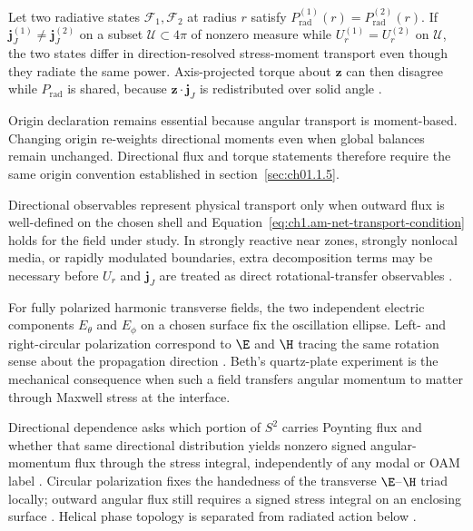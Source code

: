 \label{prop:ch1.directional-nonequivalence}
Let two radiative states \(\mathcal{F}_1,\mathcal{F}_2\) at radius \(r\) satisfy
\(P_{\mathrm{rad}}^{(1)}(r)=P_{\mathrm{rad}}^{(2)}(r)\). If \(\mathbf{j}_J^{(1)}\neq\mathbf{j}_J^{(2)}\) on a subset \(\mathcal{U}\subset4\pi\) of nonzero measure while \(U_r^{(1)}=U_r^{(2)}\) on \(\mathcal{U}\), the two states differ in direction-resolved stress-moment transport even though they radiate the same power. Axis-projected torque about \(\hat{\mathbf{z}}\) can then disagree while \(P_{\mathrm{rad}}\) is shared, because \(\hat{\mathbf{z}}\cdot\mathbf{j}_J\) is redistributed over solid angle \cite{stratton1941}.

Origin declaration remains essential because angular transport is moment-based.
Changing origin re-weights directional moments even when global balances remain
unchanged. Directional flux and torque statements therefore require the same origin convention established in section~\ref{sec:ch01.1.5}.

Directional observables represent physical transport
only when outward flux is well-defined on the chosen shell and Equation~\eqref{eq:ch1.am-net-transport-condition} holds for the field under study.
In strongly reactive near zones, strongly nonlocal media, or rapidly modulated
boundaries, extra decomposition terms may be necessary before \(U_r\) and
\(\mathbf{j}_J\) are treated as direct rotational-transfer observables
\cite{stratton1941}.

For fully polarized harmonic transverse fields, the two independent electric
components \(E_\theta\) and \(E_\phi\) on a chosen surface fix the oscillation
ellipse. Left- and right-circular polarization correspond to \(\E\) and \(\H\)
tracing the same rotation sense about the propagation direction
\cite{stratton1941}. Beth's quartz-plate experiment \cite{beth1936} is the
mechanical consequence when such a field transfers angular momentum to matter
through Maxwell stress at the interface.
\label{eq:ch1.polarization-ellipse-angles}
\label{eq:ch1.jones-rotation}
\label{eq:ch1.coherency-matrix}
\label{eq:ch1.polarization-degree}

Directional dependence asks which portion of $S^{2}$ carries Poynting flux and whether that same directional distribution yields nonzero signed angular-momentum flux through the stress integral, independently of any modal or OAM label \cite{belinfante1940}. Circular polarization fixes the handedness of the transverse \(\E\)--\(\H\) triad locally; outward angular flux still requires a signed stress integral on an enclosing surface \cite{stratton1941,beth1936}. Helical phase topology is separated from radiated action below \cite{allen1992}.

